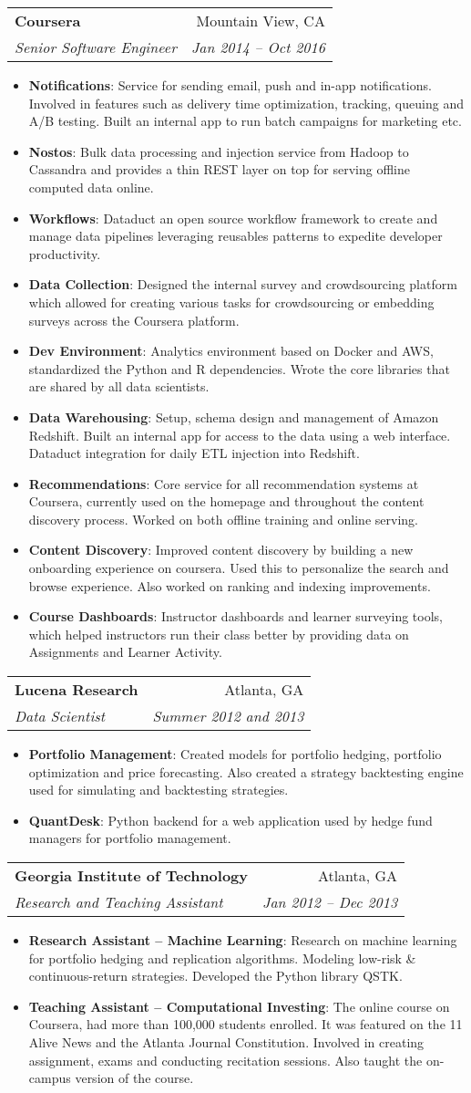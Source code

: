 \documentclass[letterpaper,11pt]{article}
\makeatletter
\newcommand{\resumeItem}[2]{
  \item\small{
    \textbf{#1}{: #2 \vspace{-2pt}}
  }
}
\newcommand{\resumeSubheading}[4]{
  \vspace{-1pt}\item
    \begin{tabular*}{0.97\textwidth}[t]{l@{\extracolsep{\fill}}r}
      \textbf{#1} & #2 \\
      \textit{\small#3} & \textit{\small #4} \\
    \end{tabular*}\vspace{-5pt}
}
\newcommand{\resumeItemListStart}{\begin{itemize}}
\newcommand{\resumeItemListEnd}{\end{itemize}\vspace{-5pt}}
\makeatother
\begin{document}
\resumeSubheading
{Coursera}{Mountain View, CA}
{Senior Software Engineer}{Jan 2014 -- Oct 2016}
\resumeItemListStart
\resumeItem{Notifications}
{Service for sending email, push and in-app notifications. Involved in features such as delivery time optimization, tracking, queuing and A/B testing. Built an internal app to run batch campaigns for marketing etc.}
\resumeItem{Nostos}
{Bulk data processing and injection service from Hadoop to Cassandra and provides a thin REST layer on top for serving offline computed data online.}
\resumeItem{Workflows}
{Dataduct an open source workflow framework to create and manage data pipelines leveraging reusables patterns to expedite developer productivity.}
\resumeItem{Data Collection}
{Designed the internal survey and crowdsourcing platform which allowed for creating various tasks for crowdsourcing or embedding surveys across the Coursera platform.}
\resumeItem{Dev Environment}
{Analytics environment based on Docker and AWS, standardized the Python and R dependencies. Wrote the core libraries that are shared by all data scientists.}
\resumeItem{Data Warehousing}
{Setup, schema design and management of Amazon Redshift. Built an internal app for access to the data using a web interface. Dataduct integration for daily ETL injection into Redshift.}
\resumeItem{Recommendations}
{Core service for all recommendation systems at Coursera, currently used on the homepage and throughout the content discovery process. Worked on both offline training and online serving.}
\resumeItem{Content Discovery}
{Improved content discovery by building a new onboarding experience on coursera. Used this to personalize the search and browse experience. Also worked on ranking and indexing improvements.}
\resumeItem{Course Dashboards}
{Instructor dashboards and learner surveying tools, which helped instructors run their class better by providing data on Assignments and Learner Activity.}
\resumeItemListEnd

\resumeSubheading
{Lucena Research}{Atlanta, GA}
{Data Scientist}{Summer 2012 and 2013}
\resumeItemListStart
\resumeItem{Portfolio Management}
{Created models for portfolio hedging, portfolio optimization and price forecasting. Also created a strategy backtesting engine used for simulating and backtesting strategies.}
\resumeItem{QuantDesk}
{Python backend for a web application used by hedge fund managers for portfolio management.}
\resumeItemListEnd

\resumeSubheading
{Georgia Institute of Technology}{Atlanta, GA}
{Research and Teaching Assistant}{Jan 2012 -- Dec 2013}
\resumeItemListStart
\resumeItem{Research Assistant -- Machine Learning}
{Research on machine learning for portfolio hedging and replication algorithms. Modeling low-risk \& continuous-return strategies. Developed the Python library QSTK.}
\resumeItem{Teaching Assistant -- Computational Investing}
{The online course on Coursera, had more than 100,000 students enrolled. It was featured on the 11 Alive News and the Atlanta Journal Constitution. Involved in creating assignment, exams and conducting recitation sessions. Also taught the on-campus version of the course.}
\resumeItemListEnd
\end{document}
